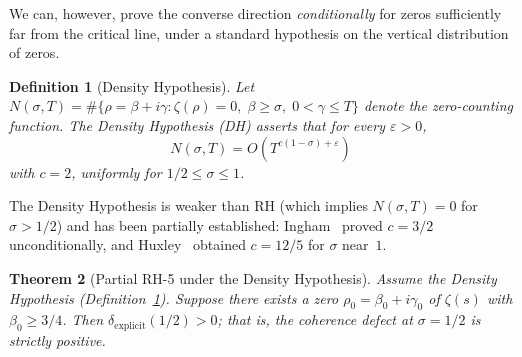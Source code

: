 \documentclass[11pt]{article}
\newtheorem{theorem}{Theorem}[section]
\newtheorem{definition}[theorem]{Definition}
\theoremstyle{remark}
\begin{document}
\medskip

We can, however, prove the converse direction \emph{conditionally} for zeros
sufficiently far from the critical line, under a standard hypothesis on the
vertical distribution of zeros.

\begin{definition}[Density Hypothesis]
\label{def:DH}
Let $N(\sigma, T) = \#\{\rho = \beta + i\gamma : \zeta(\rho)=0,\;
\beta \geq \sigma,\; 0 < \gamma \leq T\}$ denote the zero-counting function.
The \emph{Density Hypothesis} (DH) asserts that for every $\varepsilon > 0$,
\[
  N(\sigma, T) = O\!\left(T^{c(1-\sigma)+\varepsilon}\right)
\]
with $c = 2$, uniformly for $1/2 \leq \sigma \leq 1$.
\end{definition}

The Density Hypothesis is weaker than RH (which implies $N(\sigma,T)=0$ for
$\sigma > 1/2$) and has been partially established: Ingham~\cite{Ingham}
proved $c = 3/2$ unconditionally, and Huxley~\cite{Huxley} obtained
$c = 12/5$ for $\sigma$ near~$1$.

\begin{theorem}[Partial RH-5 under the Density Hypothesis]
\label{thm:partial-RH5}
Assume the Density Hypothesis (Definition~\ref{def:DH}).
Suppose there exists a zero $\rho_0 = \beta_0 + i\gamma_0$ of $\zeta(s)$
with $\beta_0 \geq 3/4$.  Then $\delta_{\mathrm{explicit}}(1/2) > 0$;
that is, the coherence defect at $\sigma = 1/2$ is strictly positive.
\end{theorem}
\end{document}
